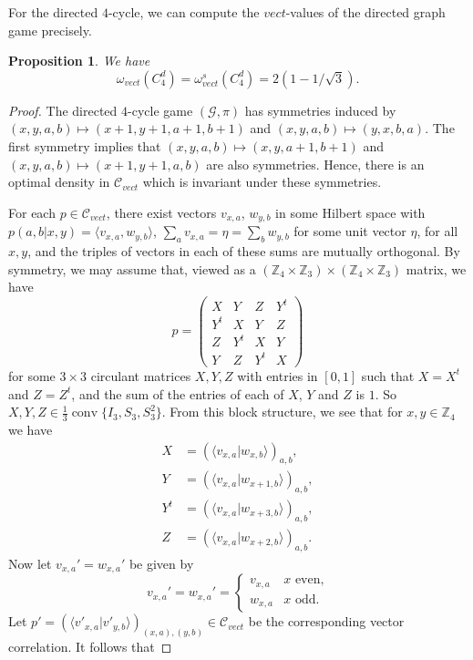 \documentclass[11pt]{amsart}
\newtheorem{prop}[thm]{Proposition}
\theoremstyle{definition}
\DeclareMathOperator{\conv}{conv}
\newcommand{\bb}[1]{\mathbb{#1}}
\newcommand{\cl}[1]{\mathcal{#1}}
\begin{document}
For the directed $4$-cycle, we can compute the $vect$-values of the directed graph game precisely.
  \begin{prop}
    We have \[\omega_{vect}(C_4^d)=\omega_{vect}^s(C_4^d)=2(1-1/\sqrt{3}).\]
  \end{prop}
  \begin{proof}
  The directed $4$-cycle game $(\cl G,\pi)$ has symmetries induced by $(x,y,a,b)\mapsto (x+1,y+1,a+1,b+1)$ and $(x,y,a,b)\mapsto (y,x,b,a)$. The first symmetry implies that $(x,y,a,b)\mapsto(x,y,a+1,b+1)$ and $(x,y,a,b)\mapsto (x+1,y+1,a,b)$ are also symmetries. Hence, there is an optimal density in $\cl C_{vect}$ which is invariant under these symmetries.

  For each $p\in\mathcal{C}_{vect}$, there exist vectors $v_{x,a}$,
  $w_{y,b}$ in some Hilbert space with
  $p(a,b|x,y)=\langle v_{x,a},w_{y,b}\rangle$,
  $\sum_a v_{x,a}=\eta=\sum_b w_{y,b}$ for some unit vector $\eta$,
  for all $x,y$, and the triples of vectors in each of these sums are
  mutually orthogonal. By symmetry, we may assume that, viewed as a $(\bb Z_4\times \bb Z_3)\times (\bb Z_4\times \bb Z_3)$ matrix, we have
  \[ p=\begin{pmatrix}
      X&Y&Z&Y^t\\
      Y^t&X&Y&Z\\
      Z&Y^t&X&Y\\
      Y&Z&Y^t&X
    \end{pmatrix}
  \]
  for some $3\times 3$ circulant matrices $X,Y,Z$ with entries in $[0,1]$ such that $X=X^t$ and $Z=Z^t$, and the sum of the entries of each of $X$, $Y$ and $Z$ is $1$. So $X,Y,Z\in \tfrac13\conv\{I_3,S_3,S_3^2\}$. From this block structure, we see that for $x,y\in \bb Z_4$ we have
  \begin{align*}
    X&=(\langle v_{x,a}|w_{x,b}\rangle)_{a,b},
    \\
    Y&=(\langle v_{x,a}|w_{x+1,b}\rangle)_{a,b},
    \\
    Y^t&=(\langle v_{x,a}|w_{x+3,b}\rangle)_{a,b},
    \\
    Z&=(\langle v_{x,a}|w_{x+2,b}\rangle)_{a,b}.
  \end{align*}
  Now let $v_{x,a}'=w_{x,a}'$ be given by
  \[ v_{x,a}'=w_{x,a}'=
    \begin{cases}
      v_{x,a}&\text{$x$ even,}\\
      w_{x,a}&\text{$x$ odd.}
    \end{cases}
  \]
  Let
  $p'=(\langle v'_{x,a}|v'_{y,b}\rangle)_{(x,a),(y,b)}\in \cl
  C_{vect}$ be the corresponding vector correlation. It follows that

\end{proof}
\end{document}
